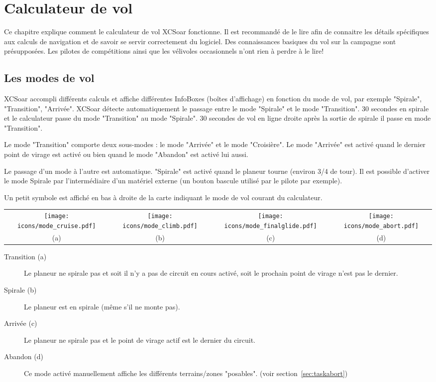 \chapter{Calculateur de vol}\label{cha:glide}
Ce chapitre explique comment le calculateur de vol XCSoar fonctionne. Il est recommandé de le lire afin de connaitre les détails spécifiques aux calculs de navigation et de savoir se servir correctement du logiciel. Des connaissances basiques du vol sur la campagne sont présupposées. Les pilotes de compétitions ainsi que les vélivoles occasionnels n'ont rien à perdre à le lire!

\section{Les modes de vol} 
XCSoar accompli différents calculs et affiche différentes InfoBoxes (boîtes d'affichage) en fonction du mode de vol, par exemple "Spirale", "Transition", "Arrivée". XCSoar détecte automatiquement le passage entre le mode "Spirale" et le mode "Transition". 30 secondes en spirale et le calculateur passe du mode "Transition" au mode "Spirale". 30 secondes de vol en ligne droite après la sortie de spirale il passe en mode "Transition".

Le mode "Transition" comporte deux sous-modes : le mode "Arrivée" et le mode "Croisière". Le mode "Arrivée" est activé quand le dernier point de virage est activé ou bien quand le mode "Abandon" est activé lui aussi.

Le passage d'un mode à l'autre est automatique. "Spirale" est activé quand le planeur tourne (environ 3/4 de tour). Il est possible d'activer le mode Spirale par l'intermédiaire d'un matériel externe (un bouton bascule utilisé par le pilote par exemple).

Un petit symbole est affiché en bas à droite de la carte indiquant le mode de vol courant du calculateur.

\begin{tabular}{c c c c}%
\texttt{[image: icons/mode\_cruise.pdf]} &
\texttt{[image: icons/mode\_climb.pdf]} &
\texttt{[image: icons/mode\_finalglide.pdf]} &
\texttt{[image: icons/mode\_abort.pdf]}\\
(a) & (b) & (c) & (d)
\end{tabular}

\begin{description}
\item[Transition (a)]   Le planeur ne spirale pas et soit il n'y a pas de circuit en cours activé, soit le prochain point de virage n'est pas le dernier.
\item[Spirale (b)]  Le planeur est en spirale (même s'il ne monte pas).
\item[Arrivée (c)]  Le planeur ne spirale pas et le point de virage actif est le dernier du circuit.
\item[Abandon (d)]  Ce mode activé manuellement affiche les différents terrains/zones "posables". (voir section~\ref{sec:taskabort}) 
\end{description}

